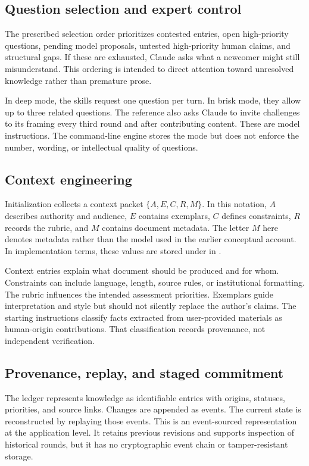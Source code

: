 \documentclass[12pt,a4paper]{article}
\newcommand{\code}[1]{\texttt{\detokenize{#1}}}
\begin{document}
\subsection{Question selection and expert control}
The prescribed selection order prioritizes contested entries, open high-priority questions, pending model proposals, untested high-priority human claims, and structural gaps. If these are exhausted, Claude asks what a newcomer might still misunderstand. This ordering is intended to direct attention toward unresolved knowledge rather than premature prose.

In deep mode, the skills request one question per turn. In brisk mode, they allow up to three related questions. The reference also asks Claude to invite challenges to its framing every third round and after contributing content. These are model instructions. The command-line engine stores the mode but does not enforce the number, wording, or intellectual quality of questions.

\subsection{Context engineering}
Initialization collects a context packet $\{A,E,C,R,M\}$. In this notation, $A$ describes authority and audience, $E$ contains exemplars, $C$ defines constraints, $R$ records the rubric, and $M$ contains document metadata. The letter $M$ here denotes metadata rather than the model used in the earlier conceptual account. In implementation terms, these values are stored under \code{context} in \code{session.json}.

Context entries explain what document should be produced and for whom. Constraints can include language, length, source rules, or institutional formatting. The rubric influences the intended assessment priorities. Exemplars guide interpretation and style but should not silently replace the author's claims. The starting instructions classify facts extracted from user-provided materials as human-origin contributions. That classification records provenance, not independent verification.

\subsection{Provenance, replay, and staged commitment}
The ledger represents knowledge as identifiable entries with origins, statuses, priorities, and source links. Changes are appended as events. The current state is reconstructed by replaying those events. This is an event-sourced representation at the application level. It retains previous revisions and supports inspection of historical rounds, but it has no cryptographic event chain or tamper-resistant storage.
\end{document}
